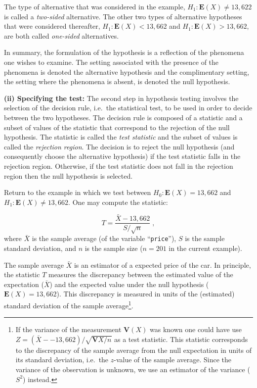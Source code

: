 \documentclass[
]{krantz}
\newcommand{\Expec}{\mathbf{E}}
\newcommand{\Var}{\mathbf{V}}
\theoremstyle{definition}
\theoremstyle{definition}
\theoremstyle{definition}
\theoremstyle{remark}
\begin{document}
The type of alternative that was considered in the example,
\(H_1: \Expec(X) \not = 13,622\) is called a \emph{two-sided} alternative. The
other two types of alternative hypotheses that were considered
thereafter, \(H_1: \Expec(X) < 13,662\) and \(H_1: \Expec(X) > 13,662\), are
both called \emph{one-sided} alternatives.

In summary, the formulation of the hypothesis is a reflection of the
phenomena one wishes to examine. The setting associated with the
presence of the phenomena is denoted the alternative hypothesis and the
complimentary setting, the setting where the phenomena is absent, is
denoted the null hypothesis.

{\textbf{(ii) Specifying the test:}} The second step in hypothesis testing
involves the selection of the decision rule, i.e.~the statistical test,
to be used in order to decide between the two hypotheses. The decision
rule is composed of a statistic and a subset of values of the statistic
that correspond to the rejection of the null hypothesis. The statistic
is called the \emph{test statistic} and the subset of values is called the
\emph{rejection region}. The decision is to reject the null hypothesis (and
consequently choose the alternative hypothesis) if the test statistic
falls in the rejection region. Otherwise, if the test statistic does not
fall in the rejection region then the null hypothesis is selected.

Return to the example in which we test between \(H_0:\Expec(X) = 13,662\)
and \(H_1:\Expec(X) \not= 13,662\). One may compute the statistic:

\[T = \frac{\bar X - 13,662}{S/\sqrt{n}}\;,\] where \(\bar X\) is the
sample average (of the variable ``\texttt{price}''), \(S\) is the sample standard
deviation, and \(n\) is the sample size (\(n = 201\) in the current
example).

The sample average \(\bar X\) is an estimator of a expected price of the
car. In principle, the statistic \(T\) measures the discrepancy between
the estimated value of the expectation (\(\bar X\)) and the expected value
under the null hypothesis (\(\Expec(X) = 13,662\)). This discrepancy is
measured in units of the (estimated) standard deviation of the sample
average\footnote{If the variance of the measurement \(\Var(X)\) was known one could
  have use \(Z = (\bar X- - 13,662)/\sqrt{\Var{X}/n}\) as a test
  statistic. This statistic corresponds to the discrepancy of the
  sample average from the null expectation in units of its standard
  deviation, i.e.~the \(z\)-value of the sample average. Since the
  variance of the observation is unknown, we use an estimator of the
  variance (\(S^2\)) instead.}.
\end{document}
